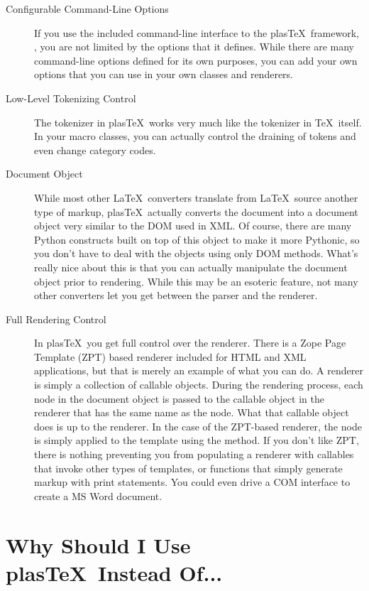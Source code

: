 \documentclass{manual}
\newcommand{\plasTeX}{plas\TeX}
\begin{document}
\begin{description}
\item[Configurable Command-Line Options] If you use the included command-line
interface to the \plasTeX\ framework, , you are not limited
by the options that it defines.  While there are many command-line options
defined for its own purposes, you can add your own options that you can 
use in your own classes and renderers.

\item[Low-Level Tokenizing Control] The tokenizer in \plasTeX\ works very 
much like the tokenizer in \TeX\ itself.  In your macro classes, you 
can actually control the draining of tokens and even change category codes.

\item[Document Object] While most other \LaTeX\ converters translate from
\LaTeX\ source another type of markup, \plasTeX\ actually converts the 
document into a document object very similar to the DOM used in XML.
Of course, there are many Python constructs built on top of this object
to make it more Pythonic, so you don't have to deal with the objects using
only DOM methods. What's really nice about this is that you can actually 
manipulate the document object prior to rendering.  While this may be an
esoteric feature, not many other converters let you get between the parser
and the renderer.

\item[Full Rendering Control] In \plasTeX\, you get full control over the
renderer.  There is a Zope Page Template (ZPT) based renderer included for HTML
and XML applications, but that is merely an example of what you can do.
A renderer is simply a collection of callable objects.  During the rendering
process, each node in the document object is passed to the callable object 
in the renderer that has the same name as the node.  What that callable object
does is up to the renderer.  In the case of the ZPT-based renderer, the 
node is simply applied to the template using the  method.
If you don't like ZPT, there is nothing preventing you from populating
a renderer with callables that invoke other types of templates, or functions
that simply generate markup with print statements.  You could even drive
a COM interface to create a MS Word document.
\end{description}


\section{Why Should I Use \plasTeX\ Instead Of...}
\end{document}
